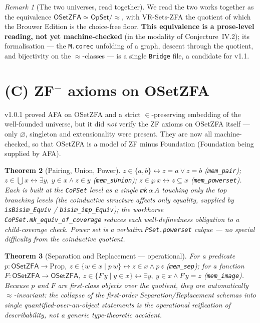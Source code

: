 \documentclass[11pt]{article}
\newtheorem{thm}{Theorem}[section]
\theoremstyle{remark}
\newtheorem{rem}[thm]{Remark}
\newcommand{\OSetZFA}{\textsf{OSetZFA}}
\newcommand{\OpSet}{\textsf{OpSet}}
\newcommand{\eq}{\approx}
\begin{document}
\begin{rem}[The two universes, read together]
We read the two works together as the equivalence $\OSetZFA \simeq \OpSet/\!\eq$, with VR-Sets-ZFA the
quotient of which the Brouwer Edition is the choice-free floor. \textbf{This equivalence is a
prose-level reading, not yet machine-checked} (in the modality of Conjecture~IV.2); its formalisation
--- the \texttt{M.corec} unfolding of a graph, descent through the quotient, and bijectivity on the
$\eq$-classes --- is a single \texttt{Bridge} file, a candidate for v1.1.
\end{rem}

\section{(C) ZF$^-$ axioms on \OSetZFA}

v1.0.1 proved AFA on \OSetZFA{} and a strict $\in$-preserving embedding of the well-founded universe,
but it did \emph{not} verify the ZF axioms on \OSetZFA{} itself --- only $\varnothing$, singleton and
extensionality were present. They are now all machine-checked, so that \OSetZFA{} is a model of ZF
minus Foundation (Foundation being supplied by AFA).

\begin{thm}[Pairing, Union, Power]
$z \in \{a,b\} \leftrightarrow z = a \vee z = b$ (\texttt{mem\_pair});
$z \in \bigcup x \leftrightarrow \exists y,\ y \in x \wedge z \in y$ (\texttt{mem\_sUnion});
$z \in \wp\,x \leftrightarrow z \subseteq x$ (\texttt{mem\_powerset}). Each is built at the
\texttt{CoPSet} level as a single \texttt{mk}\,$\alpha\,A$ touching only the top branching levels (the
coinductive structure affects only equality, supplied by \texttt{isBisim\_Equiv} /
\texttt{bisim\_imp\_Equiv}); the workhorse \texttt{CoPSet.mk\_equiv\_of\_coverage} reduces each
well-definedness obligation to a child-coverage check. Power set is a verbatim \texttt{PSet.powerset}
calque --- no special difficulty from the coinductive quotient.
\end{thm}

\begin{thm}[Separation and Replacement --- operational]
For a predicate $p:\OSetZFA\to\mathrm{Prop}$,
$z \in \{w \in x \mid p\,w\} \leftrightarrow z \in x \wedge p\,z$ (\texttt{mem\_sep}); for a function
$F:\OSetZFA\to\OSetZFA$, $z \in \{F\,y \mid y \in x\} \leftrightarrow \exists y,\ y \in x \wedge
F\,y = z$ (\texttt{mem\_image}). Because $p$ and $F$ are first-class objects \emph{over the quotient},
they are automatically $\eq$-invariant: the collapse of the first-order Separation/Replacement
\emph{schemas} into single quantified-over-an-object statements is the operational reification of
describability, not a generic type-theoretic accident.
\end{thm}
\end{document}
